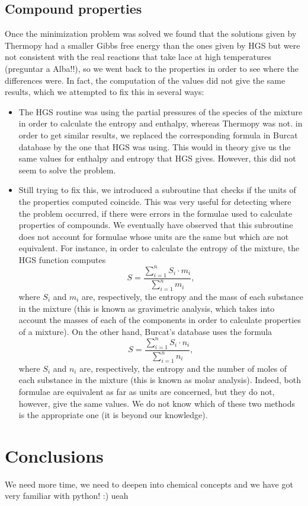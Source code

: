 \documentclass[a4paper,10pt]{article}
\theoremstyle{plain}
\theoremstyle{definition}
\theoremstyle{remark}
\begin{document}
\subsection{Compound properties}
Once the minimization problem was solved we found that the solutions given by Thermopy had a smaller Gibbs free energy than the ones given by HGS but were not consistent with the real reactions that take lace at high temperatures  (preguntar a Alba!!), so we went back to the properties in order to see where the differences were. In fact, the computation of the values did not give the same results, which we attempted to fix this in several ways:
\begin{itemize}
\item The HGS routine was using the partial pressures of the species of the mixture in order to calculate the entropy and enthalpy, whereas Thermopy was not. in order to get similar results, we replaced the corresponding formula in Burcat database by the one that HGS was using. This would in theory give us the same values for enthalpy and entropy that HGS gives. However, this did not seem to solve the problem.
\item Still trying to fix this, we introduced a subroutine that checks if the units of the properties computed coincide. This was very useful for detecting where the problem occurred, if there were errors in the formulae used to calculate properties of compounds. We eventually have observed that this subroutine does not account for formulae whose units are the same but which are not equivalent. For instance, in order to calculate the entropy of the mixture, the HGS function computes
\begin{equation}
S = \frac{\sum_{i=1}^n S_i\cdot m_i}{\sum_{i=1}^n m_i},
\end{equation}
where $S_i$ and $m_i$ are, respectively, the entropy and the mass of each substance in the mixture (this is known as gravimetric analysis, which takes into account the masses of each of the components in order to calculate properties of a mixture). On the other hand, Burcat's database uses the formula
\begin{equation}
S = \frac{\sum_{i=1}^n S_i\cdot n_i}{\sum_{i=1}^n n_i},
\end{equation}
where $S_i$ and $n_i$ are, respectively, the entropy and the number of moles of each substance in the mixture (this is known as molar analysis). Indeed, both formulae are equivalent as far as units are concerned, but they do not, however, give the same values. We do not know which of these two methods is the appropriate one (it is beyond our knowledge).
\end{itemize}

\section{Conclusions}
We need more time, we need to deepen into chemical concepts and we have got very familiar with python! :) ueah
\end{document}
